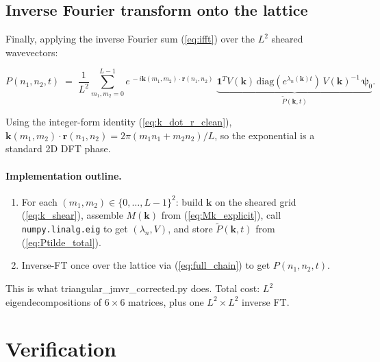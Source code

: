 \documentclass[11pt,a4paper]{article}
\newcommand{\vk}{\mathbf{k}}
\newcommand{\vr}{\mathbf{r}}
\newcommand{\Ptilde}{\widetilde{P}}
\begin{document}
\subsection{Inverse Fourier transform onto the lattice}\label{ssec:invft-explicit}

Finally, applying the inverse Fourier sum (\ref{eq:ifft}) over the
$L^2$ sheared wavevectors:
\begin{correctbox}
\begin{equation}\label{eq:full_chain}
P(n_1, n_2, t) \;=\; \frac{1}{L^2}\sum_{m_1, m_2 = 0}^{L-1}
  e^{\,-i \vk(m_1, m_2)\cdot \vr(n_1, n_2)} \;
  \underbrace{\mathbf{1}^{T} V(\vk)\, \mathrm{diag}(e^{\lambda_n(\vk) t})\, V(\vk)^{-1}\, \bm{\psi}_0}_{\Ptilde(\vk, t)}.
\end{equation}
\end{correctbox}
Using the integer-form identity (\ref{eq:k_dot_r_clean}),
$\vk(m_1, m_2) \cdot \vr(n_1, n_2) = 2\pi(m_1 n_1 + m_2 n_2)/L$, so the
exponential is a standard 2D DFT phase.

\paragraph{Implementation outline.}
\begin{enumerate}[label=(\arabic*),leftmargin=*,nosep]
\item For each $(m_1, m_2) \in \{0,\ldots,L-1\}^2$: build $\vk$ on the
  sheared grid (\ref{eq:k_shear}), assemble $M(\vk)$ from
  (\ref{eq:Mk_explicit}), call \texttt{numpy.linalg.eig} to get
  $(\lambda_n, V)$, and store $\Ptilde(\vk, t)$ from (\ref{eq:Ptilde_total}).
\item Inverse-FT once over the lattice via (\ref{eq:full_chain}) to get
  $P(n_1, n_2, t)$.
\end{enumerate}
This is what {\sf triangular\_jmvr\_corrected.py} does. Total cost:
$L^2$ eigendecompositions of $6\times 6$ matrices, plus one $L^2 \times L^2$
inverse FT.

\section{Verification}\label{sec:verification}
\end{document}
